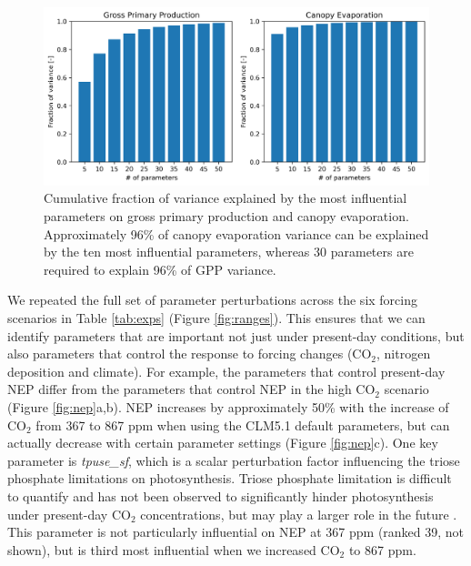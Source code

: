 \documentclass[draft]{agujournal2019}
\begin{document}
\begin{figure}[h]
\centering
\includegraphics[width=\textwidth]{../figs/variance.png}
\caption{Cumulative fraction of variance explained by the most influential parameters on gross primary production and canopy evaporation. Approximately 96\% of canopy evaporation variance can be explained by the ten most influential parameters, whereas 30 parameters are required to explain 96\% of GPP variance.}
\label{fig:variance}
\end{figure}

We repeated the full set of parameter perturbations across the six forcing scenarios in Table \ref{tab:exps} (Figure \ref{fig:ranges}). This ensures that we can identify parameters that are important not just under present-day conditions, but also parameters that control the response to forcing changes (CO$_2$, nitrogen deposition and climate). For example, the parameters that control present-day NEP differ  from the parameters that control NEP in the high CO$_2$ scenario (Figure \ref{fig:nep}a,b). NEP increases by approximately 50\% with the increase of CO$_2$ from 367 to 867 ppm when using the CLM5.1 default parameters, but can actually decrease with certain parameter settings (Figure \ref{fig:nep}c). One key parameter is \textit{tpuse\_sf}, which is a scalar perturbation factor influencing the triose phosphate limitations on photosynthesis. Triose phosphate limitation is difficult to quantify and has not been observed to significantly hinder photosynthesis under present-day CO$_2$ concentrations, but may play a larger role in the future \cite{lombardozzi2018,kumarathunge2019}. This parameter is not particularly influential on NEP at 367 ppm (ranked 39, not shown), but is third most influential when we increased CO$_2$ to 867 ppm. 
\end{document}
